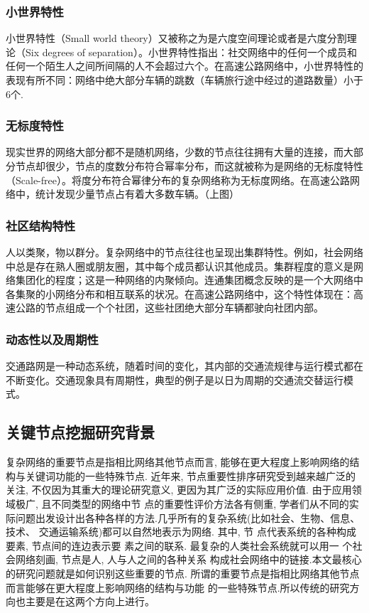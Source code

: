 \subsubsection{小世界特性}

    小世界特性（Small world theory）又被称之为是六度空间理论或者是六度分割理论（Six degrees of separation）。小世界特性指出：社交网络中的任何一个成员和任何一个陌生人之间所间隔的人不会超过六个。在高速公路网络中，小世界特性的表现有所不同：网络中绝大部分车辆的跳数（车辆旅行途中经过的道路数量）小于6个.
    
\subsubsection{无标度特性}
				现实世界的网络大部分都不是随机网络，少数的节点往往拥有大量的连接，而大部分节点却很少，节点的度数分布符合幂率分布，而这就被称为是网络的无标度特性（Scale-free）。将度分布符合幂律分布的复杂网络称为无标度网络。在高速公路网络中，统计发现少量节点占有着大多数车辆。（上图）
\subsubsection{社区结构特性}
				人以类聚，物以群分。复杂网络中的节点往往也呈现出集群特性。例如，社会网络中总是存在熟人圈或朋友圈，其中每个成员都认识其他成员。集群程度的意义是网络集团化的程度；这是一种网络的内聚倾向。连通集团概念反映的是一个大网络中各集聚的小网络分布和相互联系的状况。在高速公路网络中，这个特性体现在：高速公路的节点组成一个个社团，这些社团绝大部分车辆都驶向社团内部。
\subsubsection{动态性以及周期性}
				交通路网是一种动态系统，随着时间的变化，其内部的交通流规律与运行模式都在不断变化。交通现象具有周期性，典型的例子是以日为周期的交通流交替运行模式。

\subsection{关键节点挖掘研究背景}

复杂网络的重要节点是指相比网络其他节点而言, 能够在更大程度上影响网络的结构与关键词功能的一些特殊节点. 近年来, 节点重要性排序研究受到越来越广泛的关注, 不仅因为其重大的理论研究意义, 更因为其广泛的实际应用价值. 由于应用领域极广, 且不同类型的网络中节 点的重要性评价方法各有侧重, 学者们从不同的实际问题出发设计出各种各样的方法.几乎所有的复杂系统(比如社会、生物、信息、技术、 交通运输系统)都可以自然地表示为网络. 其中, 节 点代表系统的各种构成要素, 节点间的连边表示要 素之间的联系. 最复杂的人类社会系统就可以用一 个社会网络刻画, 节点是人, 人与人之间的各种关系 构成社会网络中的链接.本文最核心的研究问题就是如何识别这些重要的节点. 所谓的重要节点是指相比网络其他节点而言能够在更大程度上影响网络的结构与功能 的一些特殊节点.所以传统的研究方向也主要是在这两个方向上进行。

